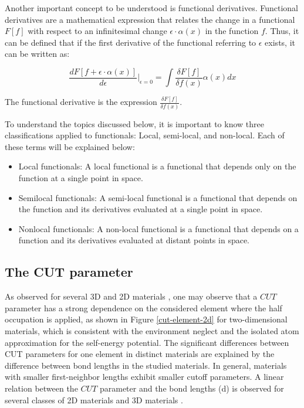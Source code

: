 Another important concept to be understood is functional derivatives. Functional derivatives are a mathematical expression that relates the change in a functional $F[f]$ with respect to an infinitesimal change $\epsilon \cdot \alpha (x)$ in the function $f$. Thus, it can be defined that if the first derivative of the functional referring to $\epsilon$ exists, it can be written as:

\begin{equation}
    \frac{d F[f + \epsilon \cdot \alpha (x)]}{d \epsilon} \bigg|_{\epsilon =0} = \int \frac{\delta F[f]}{\delta f(x)} \alpha(x) dx
\end{equation}

The functional derivative is the expression $\frac{\delta F[f]}{\delta f(x)}$.

To understand the topics discussed below, it is important to know three classifications applied to functionals: Local, semi-local, and non-local. Each of these terms will be explained below:

\begin{itemize}
\item Local functionals: A local functional is a functional that depends only on the function at a single point in space.

\item Semilocal functionals: A semi-local functional is a functional that depends on the function and its derivatives evaluated at a single point in space.

\item Nonlocal functionals: A non-local functional is a functional that depends on a function and its derivatives evaluated at distant points in space.
\end{itemize}


\subsection{The CUT parameter} 
As observed for several 3D and 2D materials \cite{PhysRevB.97.045426}, one may observe that a $CUT$ parameter has a strong dependence on the considered element where the half occupation is applied, as shown in Figure \ref{cut-element-2d} for two-dimensional materials, which is consistent with the environment neglect and the isolated atom approximation for the self-energy potential. The significant differences between CUT parameters for one element in distinct materials are explained by the difference between bond lengths in the studied materials. In general, materials with smaller first-neighbor lengths exhibit smaller cutoff parameters. A linear relation between the $CUT$ parameter and the bond lengths (d) is observed for several classes of 2D materials \cite{PhysRevB.97.045426} and 3D materials \cite{PhysRevB.78.125116}.

